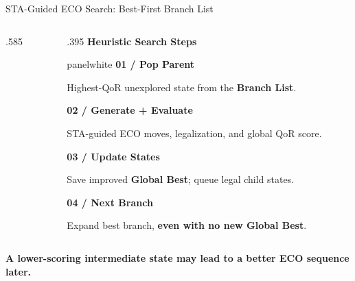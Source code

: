 \documentclass[aspectratio=169,10pt]{beamer}
\begin{document}
\begin{frame}{STA-Guided ECO Search: Best-First Branch List}
\begin{columns}[T,onlytextwidth]
\begin{column}{.585\textwidth}
    \end{column}
    \begin{column}{.395\textwidth}
      {\small\bfseries\color{Accent}Heuristic Search Steps}\par\vspace{.12cm}
      \begin{beamercolorbox}[rounded=true,sep=.15cm,wd=\linewidth]{panelwhite}
        {\small\bfseries\color{Accent}01 / Pop Parent}\par
        {\scriptsize Highest-QoR unexplored state from the \textbf{Branch List}.}\par
        \vspace{.10cm}
        {\small\bfseries\color{Accent}02 / Generate + Evaluate}\par
        {\scriptsize STA-guided ECO moves, legalization, and global QoR score.}\par
        \vspace{.10cm}
        {\small\bfseries\color{Accent}03 / Update States}\par
        {\scriptsize Save improved \textbf{Global Best}; queue legal child states.}\par
        \vspace{.10cm}
        {\small\bfseries\color{Accent}04 / Next Branch}\par
        {\scriptsize Expand best branch, \textbf{even with no new Global Best}.}
      \end{beamercolorbox}
    \end{column}
  \end{columns}
  \vspace{.10cm}
  {\scriptsize\bfseries\color{Accent}A lower-scoring intermediate state may lead to a better ECO sequence later.}\par
\end{frame}
\end{document}
